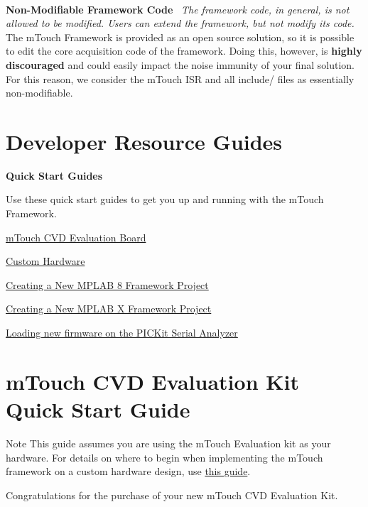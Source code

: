 \begin{DoxyItemize}
~\newline
 \item {\bfseries Non-\/\+Modifiable Framework Code}~\newline
{\itshape The framework code, in general, is not allowed to be modified. Users can extend the framework, but not modify its code.}~\newline
 The m\+Touch Framework is provided as an open source solution, so it is possible to edit the core acquisition code of the framework. Doing this, however, is {\bfseries highly discouraged} and could easily impact the noise immunity of your final solution. For this reason, we consider the m\+Touch I\+S\+R and all {\ttfamily include/} files as essentially non-\/modifiable.~\newline
\end{DoxyItemize}
\hypertarget{_getting_started_GSGuides}{}\section{Developer Resource Guides}\label{_getting_started_GSGuides}
{\bfseries Quick Start Guides}

Use these quick start guides to get you up and running with the m\+Touch Framework. \begin{DoxyItemize}
\item \hyperlink{GettingStartedEval}{m\+Touch C\+V\+D Evaluation Board} \item \hyperlink{GettingStartedCustom}{Custom Hardware} \item \hyperlink{GettingStartedNewP8}{Creating a New M\+P\+L\+A\+B 8 Framework Project} \item \hyperlink{GettingStartedNewPX}{Creating a New M\+P\+L\+A\+B X Framework Project} \item \hyperlink{PKSARS232}{Loading new firmware on the P\+I\+C\+Kit Serial Analyzer} \end{DoxyItemize}
\hypertarget{GettingStartedEval}{}\section{m\+Touch C\+V\+D Evaluation Kit Quick Start Guide}\label{GettingStartedEval}
\begin{DoxyNote}{Note}
This guide assumes you are using the m\+Touch Evaluation kit as your hardware. For details on where to begin when implementing the m\+Touch framework on a custom hardware design, use \hyperlink{GettingStartedCustom}{this guide}.
\end{DoxyNote}
Congratulations for the purchase of your new m\+Touch C\+V\+D Evaluation Kit.

